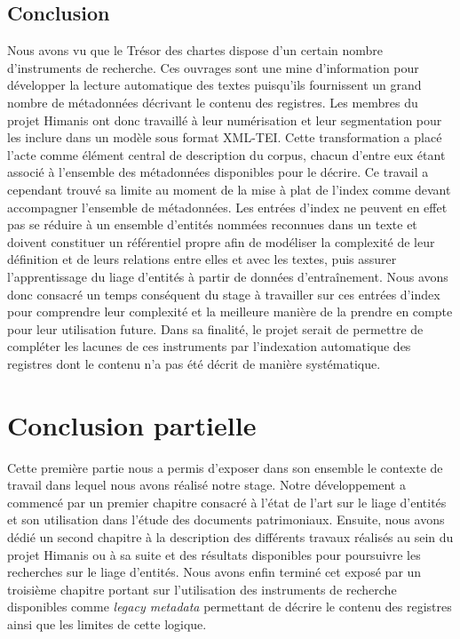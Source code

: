 \documentclass[a4paper,12pt,twoside]{book}
\begin{document}
	\section*{Conclusion}
	
	Nous avons vu que le Trésor des chartes dispose d'un certain nombre d'instruments de recherche. Ces ouvrages sont une mine d'information pour développer la lecture automatique des textes puisqu'ils fournissent un grand nombre de métadonnées décrivant le contenu des registres. Les membres du projet Himanis ont donc travaillé à leur numérisation et leur segmentation pour les inclure dans un modèle sous format XML-TEI. Cette transformation a placé l'acte comme élément central de description du corpus, chacun d'entre eux étant associé à l'ensemble des métadonnées disponibles pour le décrire. Ce travail a cependant trouvé sa limite au moment de la mise à plat de l'index comme devant accompagner l'ensemble de métadonnées. Les entrées d'index ne peuvent en effet pas se réduire à un ensemble d'entités nommées reconnues dans un texte et doivent constituer un référentiel propre afin de modéliser la complexité de leur définition et de leurs relations entre elles et avec les textes, puis assurer l'apprentissage du liage d'entités à partir de données d'entraînement. Nous avons donc consacré un temps conséquent du stage à travailler sur ces entrées d'index pour comprendre leur complexité et la meilleure manière de la prendre en compte pour leur utilisation future. Dans sa finalité, le projet serait de permettre de compléter les lacunes de ces instruments par l'indexation automatique des registres dont le contenu n'a pas été décrit de manière systématique.
	
	\chapter*{Conclusion partielle}
	
	Cette première partie nous a permis d'exposer dans son ensemble le contexte de travail dans lequel nous avons réalisé notre stage. Notre développement a commencé par un premier chapitre consacré à l'état de l'art sur le liage d'entités et son utilisation dans l'étude des documents patrimoniaux. Ensuite, nous avons dédié un second chapitre à la description des différents travaux réalisés au sein du projet Himanis ou à sa suite et des résultats disponibles pour poursuivre les recherches sur le liage d'entités. Nous avons enfin terminé cet exposé par un troisième chapitre portant sur l'utilisation des instruments de recherche disponibles comme \textit{legacy metadata} permettant de décrire le contenu des registres ainsi que les limites de cette logique.
	
\end{document}
